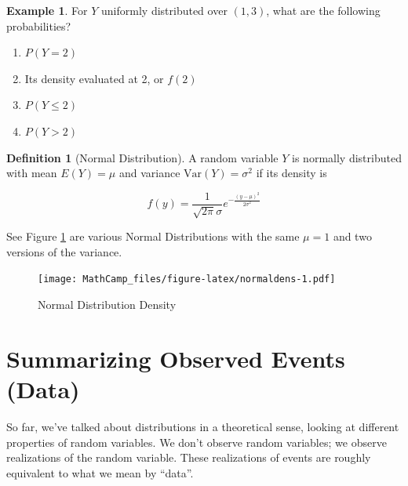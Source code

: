 \documentclass[
]{book}
\providecommand{\tightlist}{%
  \setlength{\itemsep}{0pt}\setlength{\parskip}{0pt}}
\theoremstyle{definition}
\newtheorem{definition}{Definition}[chapter]
\theoremstyle{definition}
\newtheorem{example}{Example}[chapter]
\theoremstyle{definition}
\theoremstyle{definition}
\theoremstyle{remark}
\begin{document}
\begin{example}
\protect\hypertarget{exm:unnamed-chunk-279}{}{\label{exm:unnamed-chunk-279} }For \(Y\) uniformly distributed over \((1,3)\), what are the following probabilities?

\begin{enumerate}
\def\labelenumi{\arabic{enumi}.}
\tightlist
\item
  \(P(Y=2)\)
\item
  Its density evaluated at 2, or \(f(2)\)
\item
  \(P(Y \le 2)\)
\item
  \(P(Y > 2)\)
\end{enumerate}
\end{example}

\begin{definition}[Normal Distribution]
\protect\hypertarget{def:unnamed-chunk-280}{}{\label{def:unnamed-chunk-280} {} }
A random variable \(Y\) is normally distributed with mean \(E(Y)=\mu\) and variance \(\text{Var}(Y)=\sigma^2\) if its density is

\[f(y)=\frac{1}{\sqrt{2\pi}\sigma}e^{-\frac{(y-\mu)^2}{2\sigma^2}}\]
\end{definition}

See Figure \ref{fig:normaldens} are various Normal Distributions with the same \(\mu = 1\) and two versions of the variance.

\begin{figure}
\centering
\texttt{[image: MathCamp\_files/figure-latex/normaldens-1.pdf]}
\caption{\label{fig:normaldens}Normal Distribution Density}
\end{figure}

\hypertarget{summarizing-observed-events-data}{%
\section{Summarizing Observed Events (Data)}\label{summarizing-observed-events-data}}

So far, we've talked about distributions in a theoretical sense, looking at different properties of random variables. We don't observe random variables; we observe realizations of the random variable. These realizations of events are roughly equivalent to what we mean by ``data''.
\end{document}
